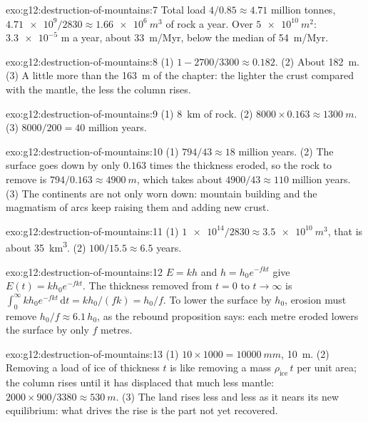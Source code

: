 \begin{solution}{exo:g12:destruction-of-mountains:7}
Total load $4/0.85 \approx 4.71$ million tonnes, $\num{4.71e9}/2830 \approx
\qty{1.66e6}{m^3}$ of rock a year. Over $\qty{5e10}{m^2}$: $\num{3.3e-5}$ m a
year, about \qty{33}{m/Myr}, below the median of \qty{54}{m/Myr}.
\end{solution}

\begin{solution}{exo:g12:destruction-of-mountains:8}
(1) $1 - 2700/3300 \approx 0.182$. (2) About \qty{182}{m}. (3) A little more
than the \qty{163}{m} of the chapter: the lighter the crust compared with the
mantle, the less the column rises.
\end{solution}

\begin{solution}{exo:g12:destruction-of-mountains:9}
(1) \qty{8}{km} of rock. (2) $8000 \times 0.163 \approx \qty{1300}{m}$.
(3) $8000/200 = 40$ million years.
\end{solution}

\begin{solution}{exo:g12:destruction-of-mountains:10}
(1) $794/43 \approx 18$ million years. (2) The surface goes down by only
$0.163$ times the thickness eroded, so the rock to remove is $794/0.163
\approx \qty{4900}{m}$, which takes about $4900/43 \approx 110$ million years.
(3) The continents are not only worn down: mountain building and the
magmatism of arcs keep raising them and adding new crust.
\end{solution}

\begin{solution}{exo:g12:destruction-of-mountains:11}
(1) $\num{1e14}/2830 \approx \qty{3.5e10}{m^3}$, that is about
\qty{35}{km^3}. (2) $100/15.5 \approx 6.5$ years.
\end{solution}

\begin{solution}{exo:g12:destruction-of-mountains:12}
$E = kh$ and $h = h_0 e^{-fkt}$ give $E(t) = kh_0 e^{-fkt}$. The thickness
removed from $t = 0$ to $t \to \infty$ is $\int_0^{\infty} kh_0
e^{-fkt}\,\mathrm{d}t = kh_0/(fk) = h_0/f$. To lower the surface by $h_0$,
erosion must remove $h_0/f \approx 6.1\,h_0$, as the rebound proposition
says: each metre eroded lowers the surface by only $f$ metres.
\end{solution}

\begin{solution}{exo:g12:destruction-of-mountains:13}
(1) $10 \times 1000 = \qty{10000}{mm}$, \qty{10}{m}. (2) Removing a load of
ice of thickness $t$ is like removing a mass $\rho_{\text{ice}}\,t$ per unit
area; the column rises until it has displaced that much less mantle:
$2000 \times 900/3380 \approx \qty{530}{m}$. (3) The land rises less and
less as it nears its new equilibrium: what drives the rise is the part not
yet recovered.
\end{solution}

